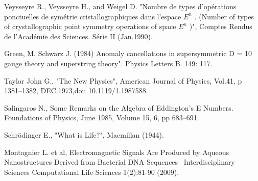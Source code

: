 \documentclass[a4paper,9pt]{article}
\begin{document}
\begin{thebibliography}{99}
 Veysseyre R., Veysseyre H., and Weigel D. "Nombre de types d’opérations ponctuelles de symétrie cristallographiques dans l'espace $E^{n}$ . (Number of types of crystallographic point symmetry operations of space $E^{n}$ )", Comptes Rendus de l’Académie des Sciences. Série II (Jan.1990).

 Green, M. Schwarz J. (1984)  Anomaly cancellations in supersymmetric D = 10 gauge theory and superstring theory". Physics Letters B. 149: 117.

 Taylor John G., "The New Physics", American Journal of Physics, Vol.41, p 1381--1382, DEC.1973,doi: 10.1119/1.1987588. 

 Salingaros N., Some Remarks on the Algebra of Eddington's E Numbers. Foundations of Physics, June 1985, Volume 15, 6, pp 683–691.

 Schrödinger E., "What is Life?", Macmillan (1944). 

 Montagnier L. et al, Electromagnetic Signals Are Produced by Aqueous Nanostructures Derived from Bacterial DNA Sequences  Interdisciplinary Sciences Computational Life Sciences 1(2):81-90 (2009).


 


\end{thebibliography}






\end{document}
